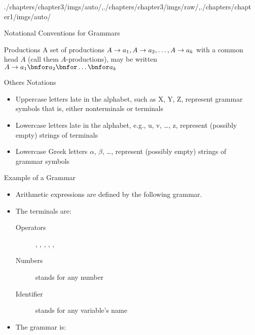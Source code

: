 \begin{graphicspathcontext}{{./chapters/chapter3/imgs/auto/},{./chapters/chapter3/imgs/raw/},{./chapters/chapter1/imgs/auto/}}
\begin{bibunit}[apalike]
\begin{frame}{Notational Conventions for Grammars \insertcontinuationtext}
	\begin{block}{Productions}
		A set of productions $A \rightarrow a_1, A \rightarrow a_2, \dots, A \rightarrow a_k$ with a common head $A$ (call them $A$-productions), may be written $A \bnfopo a_1 \bnfor a_2 \bnfor \dots \bnfor a_k$
	\end{block}
	\vspace{1cm}
	\begin{block}{Others Notations}
		\begin{itemize}
			\item Uppercase letters late in the alphabet, such as X, Y, Z, represent grammar symbols that is, either nonterminals or terminals
			\item Lowercase letters late in the alphabet, e.g., u, v, \dots, z, represent (possibly empty) strings of terminals
			\item Lowercase Greek letters $\alpha$, $\beta$, \dots, represent (possibly empty) strings of grammar symbols
		\end{itemize}
	\end{block}
\end{frame}

\begin{frame}[t,fragile,background={10}]{Example of a Grammar}
	\begin{itemize}
		\item Arithmetic expressions are defined by the following grammar.
		\item The terminals are: \begin{description}
			\item[Operators] \bnfts{+}, \bnfts{-}, \bnfts{*}, \bnfts{/}, \bnfts{(}, \bnfts{)}
			\item[Numbers]  stands for any number
			\item[Identifier]  stands for any variable's name
		\end{description}
		\item The grammar is:
	\end{itemize}
	\begin{bnf}
		 \\
		 \\
		 \\
		 \\
		 \\
		 \\
		 \\
	\end{bnf}
\end{frame}


\end{bibunit}
\end{graphicspathcontext}
